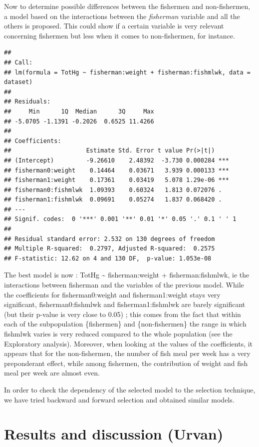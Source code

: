 \documentclass[12pt,]{article}
\begin{document}
Now to determine possible differences between the fishermen and
non-fishermen, a model based on the interactions between the
\emph{fisherman} variable and all the others is proposed. This could
show if a certain variable is very relevant concerning fishermen but
less when it comes to non-fishermen, for instance.

\begin{verbatim}
## 
## Call:
## lm(formula = TotHg ~ fisherman:weight + fisherman:fishmlwk, data = dataset)
## 
## Residuals:
##     Min      1Q  Median      3Q     Max 
## -5.0705 -1.1391 -0.2026  0.6525 11.4266 
## 
## Coefficients:
##                     Estimate Std. Error t value Pr(>|t|)    
## (Intercept)         -9.26610    2.48392  -3.730 0.000284 ***
## fisherman0:weight    0.14464    0.03671   3.939 0.000133 ***
## fisherman1:weight    0.17361    0.03419   5.078 1.29e-06 ***
## fisherman0:fishmlwk  1.09393    0.60324   1.813 0.072076 .  
## fisherman1:fishmlwk  0.09691    0.05274   1.837 0.068420 .  
## ---
## Signif. codes:  0 '***' 0.001 '**' 0.01 '*' 0.05 '.' 0.1 ' ' 1
## 
## Residual standard error: 2.532 on 130 degrees of freedom
## Multiple R-squared:  0.2797, Adjusted R-squared:  0.2575 
## F-statistic: 12.62 on 4 and 130 DF,  p-value: 1.053e-08
\end{verbatim}

The best model is now : TotHg \textasciitilde{} fisherman:weight +
fisherman:fishmlwk, ie the interactions between fisherman and the
variables of the previous model. While the coefficients for
fisherman0:weight and fisherman1:weight stays very significant,
fisherman0:fishmlwk and fisherman1:fishmlwk are barely significant (but
their p-value is very close to 0.05) ; this comes from the fact that
within each of the subpopulation \{fishermen\} and \{non-fishermen\} the
range in which fishmlwk varies is very reduced compared to the whole
population (see the Exploratory analysis). Moreover, when looking at the
values of the coefficients, it appears that for the non-fishermen, the
number of fish meal per week has a very preponderant effect, while among
fishermen, the contribution of weight and fish meal per week are almost
even.

In order to check the dependency of the selected model to the selection
technique, we have tried backward and forward selection and obtained
similar models.

\section{Results and discussion
(Urvan)}\label{results-and-discussion-urvan}
\end{document}
